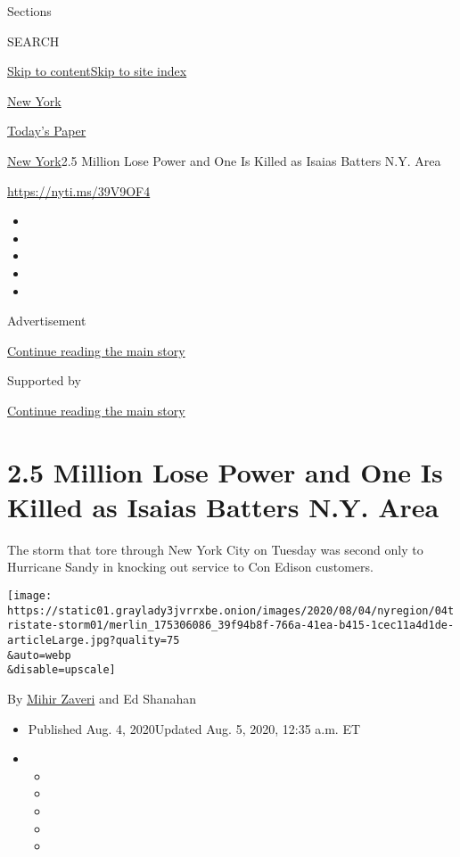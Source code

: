 Sections

SEARCH

\protect\hyperlink{site-content}{Skip to
content}\protect\hyperlink{site-index}{Skip to site index}

\href{https://www.nytimes3xbfgragh.onion/section/nyregion}{New York}

\href{https://myaccount.nytimes3xbfgragh.onion/auth/login?response_type=cookie\&client_id=vi}{}

\href{https://www.nytimes3xbfgragh.onion/section/todayspaper}{Today's
Paper}

\href{/section/nyregion}{New York}\textbar{}2.5 Million Lose Power and
One Is Killed as Isaias Batters N.Y. Area

\url{https://nyti.ms/39V9OF4}

\begin{itemize}
\item
\item
\item
\item
\item
\end{itemize}

Advertisement

\protect\hyperlink{after-top}{Continue reading the main story}

Supported by

\protect\hyperlink{after-sponsor}{Continue reading the main story}

\hypertarget{25-million-lose-power-and-one-is-killed-as-isaias-batters-ny-area}{%
\section{2.5 Million Lose Power and One Is Killed as Isaias Batters N.Y.
Area}\label{25-million-lose-power-and-one-is-killed-as-isaias-batters-ny-area}}

The storm that tore through New York City on Tuesday was second only to
Hurricane Sandy in knocking out service to Con Edison customers.

\texttt{[image: https://static01.graylady3jvrrxbe.onion/images/2020/08/04/nyregion/04tristate-storm01/merlin\_175306086\_39f94b8f-766a-41ea-b415-1cec11a4d1de-articleLarge.jpg?quality=75\\\&auto=webp\\\&disable=upscale]}

By \href{https://www.nytimes3xbfgragh.onion/by/mihir-zaveri}{Mihir
Zaveri} and Ed Shanahan

\begin{itemize}
\item
  Published Aug. 4, 2020Updated Aug. 5, 2020, 12:35 a.m. ET
\item
  \begin{itemize}
  \item
  \item
  \item
  \item
  \item
  \end{itemize}
\end{itemize}

